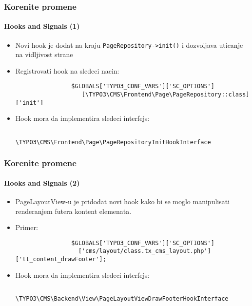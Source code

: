 \begin{frame}[fragile]
	\frametitle{Korenite promene}
	\framesubtitle{Hooks and Signals (1)}

	\begin{itemize}

		\item Novi hook je dodat na kraju \texttt{PageRepository->init()}
			i dozvoljava uticanje na vidljivost strane

		\item Registrovati hook na sledeci nacin:
			\begin{lstlisting}
				$GLOBALS['TYPO3_CONF_VARS']['SC_OPTIONS']
				   [\TYPO3\CMS\Frontend\Page\PageRepository::class]['init']
			\end{lstlisting}

		\item Hook mora da implementira sledeci interfejs:
			\begin{lstlisting}
				\TYPO3\CMS\Frontend\Page\PageRepositoryInitHookInterface
			\end{lstlisting}

	\end{itemize}

\end{frame}


\begin{frame}[fragile]
	\frametitle{Korenite promene}
	\framesubtitle{Hooks and Signals (2)}

	\begin{itemize}

		\item PageLayoutView-u je pridodat novi hook kako bi se moglo manipulisati renderanjem futera kontent elemenata.

		\item Primer:
			\begin{lstlisting}
				$GLOBALS['TYPO3_CONF_VARS']['SC_OPTIONS']
				  ['cms/layout/class.tx_cms_layout.php']['tt_content_drawFooter'];
			\end{lstlisting}

		\item Hook mora da implementira sledeci interfejs:
			\begin{lstlisting}
				\TYPO3\CMS\Backend\View\PageLayoutViewDrawFooterHookInterface
			\end{lstlisting}

	\end{itemize}

\end{frame}

